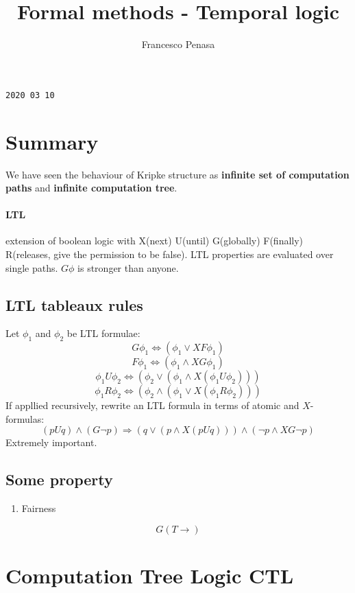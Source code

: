 \documentclass[11pt]{article}
\begin{document}
\author{Francesco Penasa}
\title{Formal methods - Temporal logic}
\maketitle

\medskip

\texttt{2020 03 10}
\section{Summary} %
\label{sec:summary}
We have seen the behaviour of Kripke structure as \textbf{infinite set of computation paths} and \textbf{infinite computation tree}.
\paragraph{LTL} %
\label{par:ltl}
extension of boolean logic with X(next) U(until) G(globally) F(finally) R(releases, give the permission to be false).
LTL properties are evaluated over single paths.
$G\phi$ is stronger than anyone.

\subsection{LTL tableaux rules} %
\label{sub:ltl_tableaux_rules}
Let $\phi _1$ and $\phi_2$ be LTL formulae:
\[
	G\phi _1 \Leftrightarrow (\phi _1 \lor XF\phi _1)
\]\[
	F\phi _1 \Leftrightarrow (\phi _1 \land XG\phi _1)
\]\[
	\phi _1 U \phi_2 \Leftrightarrow (\phi_2 \lor (\phi _1 \land X(\phi _1 U \phi_2)))
\]\[
	\phi _1 R \phi_2 \Leftrightarrow (\phi_2 \land (\phi _1 \lor X(\phi _1 R \phi_2)))
\]
If appllied recursively, rewrite an LTL formula in terms of atomic and $X$-formulas:
\[
	(pUq)\land(G\lnot p) \Rightarrow (q \lor (p \land X(p U q))) \land (\lnot p \land XG \lnot p)
\]
Extremely important.
\subsection{Some property} %
\label{sub:some_property}
\begin{enumerate}
	\item Fairness 
\end{enumerate}

\[
	G(T \rightarrow)
\]
\section{Computation Tree Logic CTL} %
\label{sec:computation_tree_logic_ctl}
\end{document}
